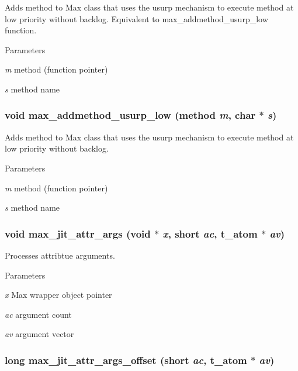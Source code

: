 Adds method to Max class that uses the usurp mechanism to execute method at low priority without backlog. Equivalent to max\_\-addmethod\_\-usurp\_\-low function.


\begin{DoxyParams}{Parameters}
\item[{\em m}]method (function pointer) \item[{\em s}]method name \end{DoxyParams}
\hypertarget{group__maxwrapmod_ga2c596151798123076dcd1d4f7d76e203}{
\subsubsection[{max\_\-addmethod\_\-usurp\_\-low}]{\setlength{\rightskip}{0pt plus 5cm}void max\_\-addmethod\_\-usurp\_\-low ({\bf method} {\em m}, \/  char $\ast$ {\em s})}}
\label{group__maxwrapmod_ga2c596151798123076dcd1d4f7d76e203}


Adds method to Max class that uses the usurp mechanism to execute method at low priority without backlog. 
\begin{DoxyParams}{Parameters}
\item[{\em m}]method (function pointer) \item[{\em s}]method name \end{DoxyParams}
\hypertarget{group__maxwrapmod_gac1ffd4864421154c8e6364b5df9a09ff}{
\subsubsection[{max\_\-jit\_\-attr\_\-args}]{\setlength{\rightskip}{0pt plus 5cm}void max\_\-jit\_\-attr\_\-args (void $\ast$ {\em x}, \/  short {\em ac}, \/  {\bf t\_\-atom} $\ast$ {\em av})}}
\label{group__maxwrapmod_gac1ffd4864421154c8e6364b5df9a09ff}


Processes attribtue arguments. 
\begin{DoxyParams}{Parameters}
\item[{\em x}]Max wrapper object pointer \item[{\em ac}]argument count \item[{\em av}]argument vector \end{DoxyParams}
\hypertarget{group__maxwrapmod_ga1a28ddf72d9bdcb2096df36384b63de6}{
\subsubsection[{max\_\-jit\_\-attr\_\-args\_\-offset}]{\setlength{\rightskip}{0pt plus 5cm}long max\_\-jit\_\-attr\_\-args\_\-offset (short {\em ac}, \/  {\bf t\_\-atom} $\ast$ {\em av})}}
\label{group__maxwrapmod_ga1a28ddf72d9bdcb2096df36384b63de6}



